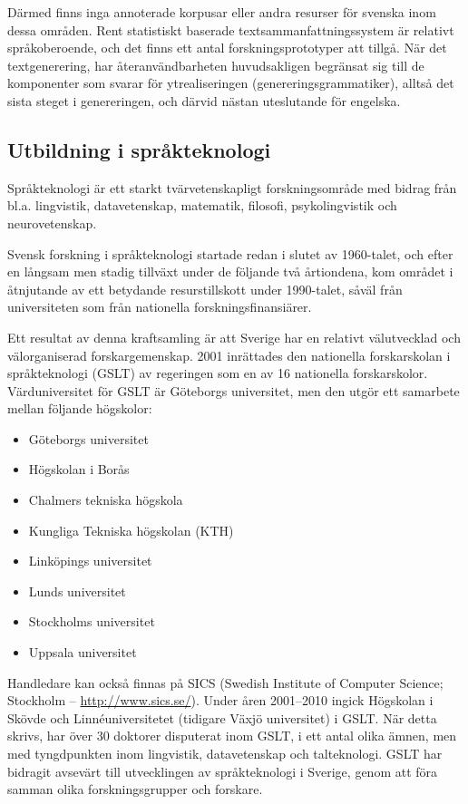 \begin{multicols}{2}
Därmed finns inga annoterade
korpusar eller andra resurser för svenska inom dessa områden. Rent
statistiskt baserade textsammanfattningssystem är relativt
språk\-obe\-ro\-en\-de, och det finns ett antal forskningsprototyper att
tillgå. När det textgenerering, har återanvändbarheten huvudsakligen
begränsat sig till de komponenter som svarar för ytrealiseringen
(genereringsgrammatiker), alltså det sista steget i genereringen, och
därvid nästan uteslutande för engelska.


\subsection{Utbildning i språkteknologi}

Språkteknologi är ett starkt tvärvetenskapligt forskningsområde med
bidrag från bl.a. lingvistik, datavetenskap, matematik, filosofi,
psykolingvistik och neurovetenskap. 

Svensk forskning i språkteknologi
startade redan i slutet av 1960-talet, och efter en långsam men stadig
tillväxt under de följande två årtiondena, kom området i åtnjutande av
ett betydande resurstillskott under 1990-talet, såväl från
universiteten som från nationella forskningsfinansiärer. 

Ett resultat av denna kraftsamling är att Sverige har en relativt
välutvecklad och välorganiserad forskargemenskap. 2001 inrättades den
nationella forskarskolan i språkteknologi (GSLT) av regeringen som en
av 16 nationella forskarskolor. Värd\-uni\-ver\-si\-tet för GSLT är
Göteborgs universitet, men den utgör ett samarbete mellan följande
högskolor:

\begin{itemize}
\item Göteborgs universitet
\item Högskolan i Borås
\item Chalmers tekniska högskola
\item Kungliga Tekniska högskolan (KTH)
\item Linköpings universitet
\item Lunds universitet
\item Stockholms universitet
\item Uppsala universitet
\end{itemize}

Handledare kan också finnas på SICS (Swedish Institute of Computer
Science; Stockholm -- \url{http://www.sics.se/}). Under åren
2001--2010 ingick Högskolan i Skövde och Linnéuniversitetet (tidigare
Växjö universitet) i GSLT. När detta skrivs, har över 30 doktorer
disputerat inom GSLT, i ett antal olika ämnen, men med tyngdpunkten
inom lingvistik, datavetenskap och talteknologi. GSLT har bidragit
avsevärt till utvecklingen av språkteknologi i Sverige, genom att föra
samman olika forskningsgrupper och forskare. 


\end{multicols}
